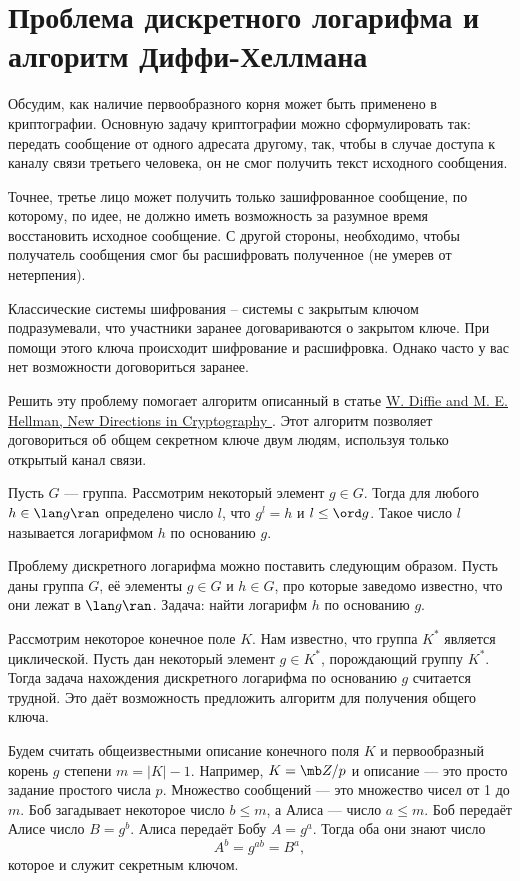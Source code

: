 \section{Проблема дискретного логарифма и алгоритм Диффи-Хеллмана}

Обсудим, как наличие первообразного корня может быть  применено в криптографии. Основную задачу криптографии можно сформулировать так: передать сообщение от одного адресата другому, так, чтобы в случае доступа к каналу связи третьего человека, он не смог получить текст исходного сообщения. 

Точнее, третье лицо может получить только зашифрованное сообщение, по которому, по идее, не должно иметь возможность за разумное время восстановить исходное сообщение. С другой стороны, необходимо, чтобы получатель сообщения смог бы расшифровать полученное (не умерев от нетерпения).

Классические системы шифрования -- системы с закрытым ключом подразумевали, что участники заранее договариваются о закрытом ключе. При помощи этого ключа происходит шифрование и расшифровка. Однако часто у вас нет возможности договориться заранее. 

Решить эту проблему помогает алгоритм описанный в статье \href{https://www-ee.stanford.edu/~hellman/publications/24.pdf}{W. Diffie and M. E. Hellman, New Directions in Cryptography }. Этот алгоритм позволяет договориться об общем секретном ключе двум людям, используя только открытый канал связи.

\dfn
Пусть $G$ --- группа. Рассмотрим некоторый элемент $g\in G$. Тогда для любого $h\in \lan g\ran$ определено число $l$, что $g^l=h$ и $l\leq \ord g$. Такое число $l$ называется логарифмом $h$ по основанию $g$.
\edfn

Проблему дискретного логарифма можно поставить следующим образом. Пусть даны группа $G$, её элементы $g\in G$ и $h\in G$, про которые заведомо известно, что они лежат в $\lan g\ran$. Задача: найти логарифм $h$ по основанию $g$.


Рассмотрим некоторое конечное поле $K$. Нам известно, что группа $K^*$ является циклической. Пусть дан некоторый элемент $g\in K^*$, порождающий группу $K^*$. Тогда задача нахождения дискретного логарифма по основанию $g$ считается трудной. Это даёт возможность предложить  алгоритм для получения общего ключа.

Будем считать общеизвестными описание конечного поля $K$ и первообразный корень $g$ степени $m=|K|-1$. Например, $K=\mb Z/p$ и описание --- это просто задание простого числа $p$. Множество сообщений --- это множество чисел от 1 до $m$. Боб загадывает некоторое число $b\leq m$, а Алиса --- число $a\leq m$. Боб передаёт Алисе число $B=g^b$. Алиса передаёт Бобу $A=g^a$. Тогда оба они знают число 
$$A^b=g^{ab}=B^a,$$
которое и служит секретным ключом.
 

